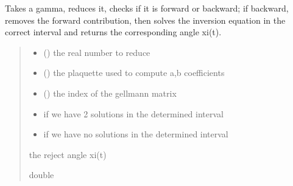 \documentclass[letterpaper,10pt,english]{sphinxmanual}
\begin{document}
\begin{fulllineitems}
\label{\detokenize{analytical_reject:analytical_reject.rejet_ana}}
\pysigstartsignatures
\pysiglinewithargsret
{}
{\sphinxparamcomma {}\sphinxparamcomma {}}
{}
\pysigstopsignatures
\sphinxAtStartPar
Takes a gamma, reduces it, checks if it is forward or backward; if backward, removes the forward contribution, then solves the inversion equation in the correct interval and returns the corresponding angle xi(t).
\begin{quote}\begin{description}
\begin{itemize}
\item {} 
\sphinxAtStartPar
{} () \textendash{} the real number to reduce

\item {} 
\sphinxAtStartPar
{} () \textendash{} the plaquette used to compute a,b coefficients

\item {} 
\sphinxAtStartPar
{} () \textendash{} the index of the gell\sphinxhyphen{}mann matrix

\end{itemize}

\begin{itemize}
\item {} 
\sphinxAtStartPar
{} \textendash{} if we have 2 solutions in the determined interval

\item {} 
\sphinxAtStartPar
{} \textendash{} if we have no solutions in the determined interval

\end{itemize}

\sphinxAtStartPar
the reject angle xi(t)

\sphinxAtStartPar
double

\end{description}\end{quote}

\end{fulllineitems}
\end{document}
